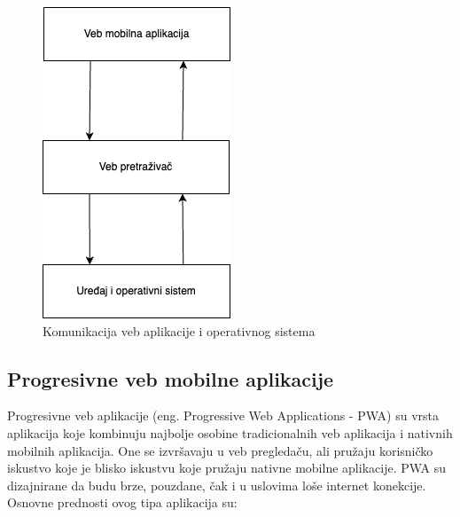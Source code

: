 \documentclass[12pt,oneside]{memoir}
\begin{document}
\begin{figure}[h]
    \centering
    \includegraphics[scale=0.5]{docs/images/chapterTwo/vebMobilnaAplikacija.png}
    \caption{Komunikacija veb aplikacije i operativnog sistema}
    \label{fig:vebMobilnaAplikacija}
\end{figure}

\subsection{Progresivne veb mobilne aplikacije}

Progresivne veb aplikacije\cite{pwa} (eng. Progressive Web Applications - PWA) su vrsta aplikacija koje kombinuju najbolje osobine tradicionalnih veb aplikacija i nativnih mobilnih aplikacija. One se izvršavaju u veb pregledaču, ali pružaju korisničko iskustvo koje je blisko iskustvu koje pružaju nativne mobilne aplikacije. PWA su dizajnirane da budu brze, pouzdane, čak i u uslovima loše internet konekcije. Osnovne prednosti ovog tipa aplikacija su:
\end{document}
